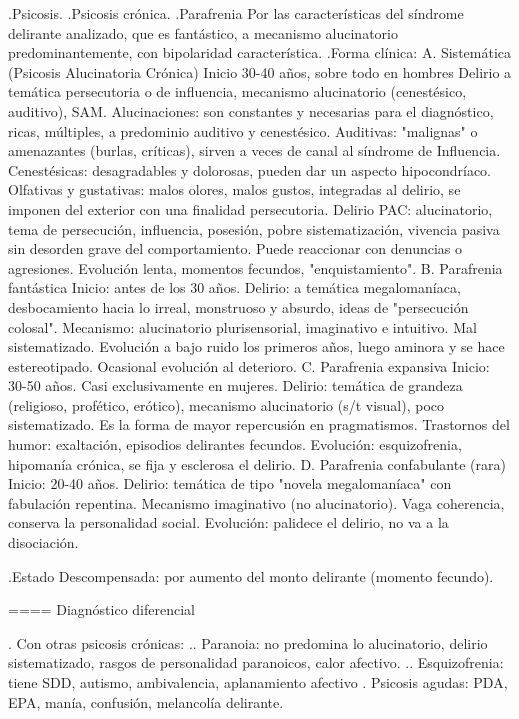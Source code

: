 \documentclass{scrbook}
\begin{document}
.Psicosis.
.Psicosis crónica.
.Parafrenia
Por las características del síndrome delirante analizado, que es fantástico, a mecanismo alucinatorio predominantemente, con bipolaridad característica.
.Forma clínica:
A. Sistemática (Psicosis Alucinatoria Crónica) Inicio 30-40 años, sobre todo en hombres Delirio a temática persecutoria o de influencia, mecanismo alucinatorio (cenestésico, auditivo), SAM. Alucinaciones: son constantes y necesarias para el diagnóstico, ricas, múltiples, a predominio auditivo y cenestésico. Auditivas: "malignas" o amenazantes (burlas, críticas), sirven a veces de canal al síndrome de Influencia. Cenestésicas: desagradables y dolorosas, pueden dar un aspecto hipocondríaco. Olfativas y gustativas: malos olores, malos gustos, integradas al delirio, se imponen del exterior con una finalidad persecutoria. Delirio PAC: alucinatorio, tema de persecución, influencia, posesión, pobre sistematización, vivencia pasiva sin desorden grave del comportamiento. Puede reaccionar con denuncias o agresiones. Evolución lenta, momentos fecundos, "enquistamiento".
B. Parafrenia fantástica Inicio: antes de los 30 años. Delirio: a temática megalomaníaca, desbocamiento hacia lo irreal, monstruoso y absurdo, ideas de "persecución colosal". Mecanismo: alucinatorio plurisensorial, imaginativo e intuitivo. Mal sistematizado. Evolución a bajo ruido los primeros años, luego aminora y se hace estereotipado. Ocasional evolución al deterioro.
C. Parafrenia expansiva Inicio: 30-50 años. Casi exclusivamente en mujeres. Delirio: temática de grandeza (religioso, profético, erótico), mecanismo alucinatorio (s/t visual), poco sistematizado. Es la forma de mayor repercusión en pragmatismos. Trastornos del humor: exaltación, episodios delirantes fecundos. Evolución: esquizofrenia, hipomanía crónica, se fija y esclerosa el delirio.
D. Parafrenia confabulante (rara) Inicio: 20-40 años. Delirio: temática de tipo "novela megalomaníaca" con fabulación repentina. Mecanismo imaginativo (no alucinatorio). Vaga coherencia, conserva la personalidad social. Evolución: palidece el delirio, no va a la disociación.

.Estado
Descompensada: por aumento del monto delirante (momento fecundo).

==== Diagnóstico diferencial

. Con otras psicosis crónicas:
.. Paranoia: no predomina lo alucinatorio, delirio sistematizado, rasgos de personalidad paranoicos, calor afectivo.
.. Esquizofrenia: tiene SDD, autismo, ambivalencia, aplanamiento afectivo
. Psicosis agudas: PDA, EPA, manía, confusión, melancolía delirante.
\end{document}
